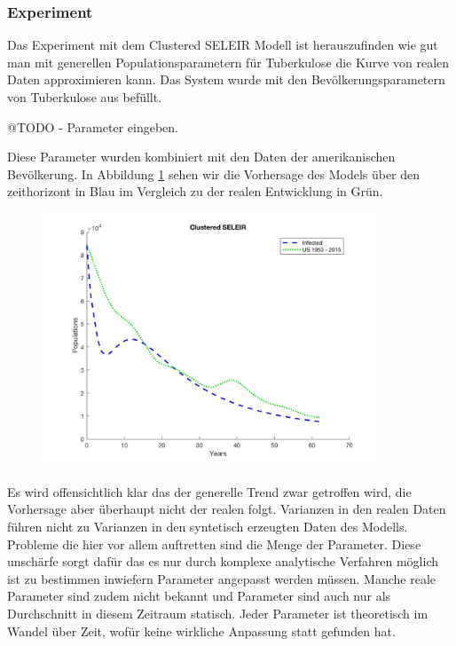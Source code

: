 \documentclass[paper=a4, fontsize=11pt, ngerman, abstract=on]{scrartcl}
\numberwithin{equation}{section} %
\numberwithin{figure}{section} %
\numberwithin{table}{section} %
\begin{document}
\subsubsection{Experiment}

Das Experiment mit dem Clustered SELEIR Modell ist herauszufinden wie gut man mit generellen Populationsparametern für Tuberkulose die Kurve von realen Daten approximieren kann. Das System wurde mit den Bevölkerungsparametern von Tuberkulose aus \cite{Trauer2014} befüllt.

@TODO - Parameter eingeben. \blindtext

Diese Parameter wurden kombiniert mit den Daten der amerikanischen Bevölkerung. In Abbildung \ref{fig:clustered-seleir-compare} sehen wir die Vorhersage des Models über den zeithorizont in Blau im Vergleich zu der realen Entwicklung in Grün.

\begin{figure}[ht]
  \centering
  \includegraphics[width=0.9\textwidth,keepaspectratio]{images/clustered_seleir_against_us_data}
  \label{fig:clustered-seleir-compare}
\end{figure}

Es wird offensichtlich klar das der generelle Trend zwar getroffen wird, die Vorhersage aber überhaupt nicht der realen folgt. Varianzen in den realen Daten führen nicht zu Varianzen in den syntetisch erzeugten Daten des Modells. Probleme die hier vor allem auftretten sind die Menge der Parameter. Diese unschärfe sorgt dafür das es nur durch komplexe analytische Verfahren möglich ist zu bestimmen inwiefern Parameter angepasst werden müssen. Manche reale Parameter sind zudem nicht bekannt und Parameter sind auch nur als Durchschnitt in diesem Zeitraum statisch. Jeder Parameter ist theoretisch im Wandel über Zeit, wofür keine wirkliche Anpassung statt gefunden hat.
\end{document}
